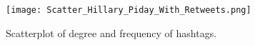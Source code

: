 \documentclass[journal, a4paper, 12pt]{article}
\begin{document}





        \begin{figure}[!hbt]
		\begin{center}
		\texttt{[image: Scatter\_Hillary\_Piday\_With\_Retweets.png]}
		\caption{Scatterplot of degree and frequency of hashtags.}
		\label{fig:scatter_hillary_piday_with_retweets}
		\end{center}
	\end{figure}
    
\end{document}
